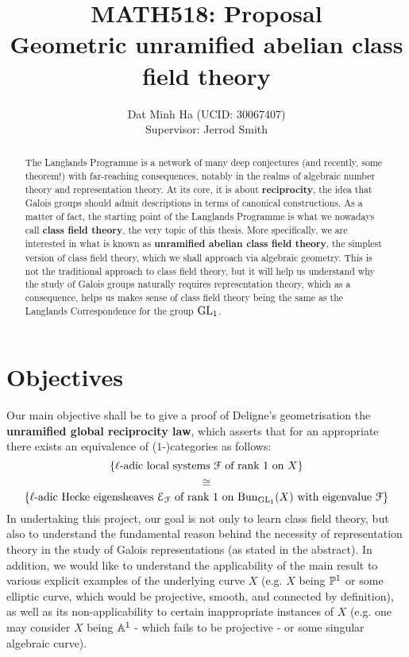 
\usepackage{soul}





	\title{\textbf{MATH518: Proposal
	\\
	Geometric unramified abelian class field theory}}
	
	\author{Dat Minh Ha (UCID: 30067407)\\Supervisor: Jerrod Smith}
	\maketitle
	
	\begin{abstract}
	    The Langlands Programme is a network of many deep conjectures (and recently, some theorem!) with far-reaching consequences, notably in the realms of algebraic number theory and representation theory. At its core, it is about \textbf{reciprocity}, the idea that Galois groups should admit descriptions in terms of canonical constructions. As a matter of fact, the starting point of the Langlands Programme is what we nowadays call \textbf{class field theory}, the very topic of this thesis. More specifically, we are interested in what is known as \textbf{unramified abelian class field theory}, the simplest version of class field theory, which we shall approach via algebraic geometry. This is not the traditional approach to class field theory, but it will help us understand why the study of Galois groups naturally requires representation theory, which as a consequence, helps us makes sense of class field theory being the same as the Langlands Correspondence for the group $\GL_1$.
	\end{abstract}
	    
	\section{Objectives}
	    Our main objective shall be to give a proof of Deligne's geometrisation the \textbf{unramified global reciprocity law}, which asserts that for an appropriate there exists an equivalence of ($1$-)categories as follows:
	        $$\left\{\text{$\ell$-adic local systems $\calF$ of rank $1$ on $X$}\right\}$$
	        $$\cong$$
	        $$\left\{\text{$\ell$-adic Hecke eigensheaves $\E_{\calF}$ of rank $1$ on $\Bun_{\GL_1}(X)$ with eigenvalue $\calF$}\right\}$$
        In undertaking this project, our goal is not only to learn class field theory, but also to understand the fundamental reason behind the necessity of representation theory in the study of Galois representations (as stated in the abstract). In addition, we would like to understand the applicability of the main result to various explicit examples of the underlying curve $X$ (e.g. $X$ being $\P^1$ or some elliptic curve, which would be projective, smooth, and connected by definition), as well as its non-applicability to certain inappropriate instances of $X$ (e.g. one may consider $X$ being $\A^1$ - which fails to be projective - or some singular algebraic curve).
	
